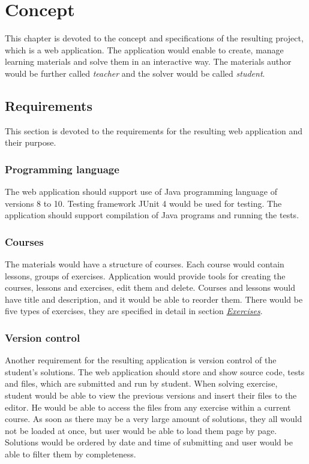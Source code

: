 \chapter[Concept]{Concept}

\label{ch:concept}

This chapter is devoted to the concept and specifications of the resulting project, which is a web application. The application would enable to create, manage learning materials and solve them in an interactive way. The materials author would be further called \textit{teacher} and the solver would be called \textit{student}.

    \section{Requirements}
    
    This section is devoted to the requirements for the resulting web application and their purpose.
    
        \subsection{Programming language}
        The web application should support use of Java programming language of versions 8 to 10. Testing framework JUnit 4 would be used for testing. The application should support compilation of Java programs and running the tests.
        
    
        \subsection{Courses}
        The materials would have a structure of courses. Each course would contain lessons, groups of exercises. Application would provide tools for creating the courses, lessons and exercises, edit them and delete. Courses and lessons would have title and description, and it would be able to reorder them. There would be five types of exercises, they are specified in detail in section \hyperref[subsec:exercise-types] {\textit{Exercises}}.
        
        \subsection{Version control}
        Another requirement for the resulting application is version control of the student's solutions. The web application should store and show source code, tests and files, which are submitted and run by student. When solving exercise, student would be able to view the previous versions and insert their files to the editor. He would be able to access the files from any exercise within a current course. As soon as there may be a very large amount of solutions, they all would not be loaded at once, but user would be able to load them page by page. Solutions would be ordered by date and time of submitting and user would be able to filter them by completeness. 
        
